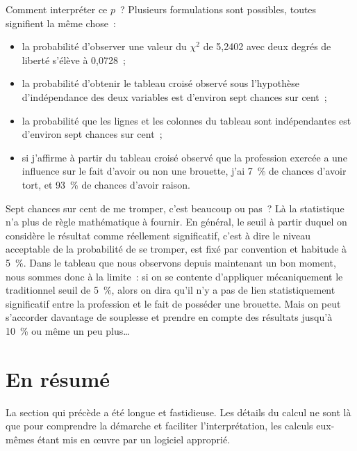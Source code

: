 \documentclass[a4paper,10pt,twoside,francais]{report}
\newcommand{\chid}{$\chi^2$\xspace}
\begin{document}
Comment interpréter ce $p$~? Plusieurs formulations sont possibles,
toutes signifient la même chose~:

\begin{itemize}
\item la probabilité d'observer une valeur du \chid de 5,2402 avec
  deux degrés de liberté s'élève à 0,0728~;
\item la probabilité d'obtenir le tableau croisé observé sous
  l'hypothèse d'indépendance des deux variables est d'environ sept
  chances sur cent~;
\item la probabilité que les lignes et les colonnes du tableau sont
  indépendantes est d'environ sept chances sur cent~;
\item si j'affirme à partir du tableau croisé observé que la
  profession exercée a une influence sur le fait d'avoir ou non une
  brouette, j'ai 7~\% de chances d'avoir tort, et 93~\% de chances
  d'avoir raison.
\end{itemize}

Sept chances sur cent de me tromper, c'est beaucoup ou pas~? Là la
statistique n'a plus de règle mathématique à fournir. En général, le
seuil à partir duquel on considère le résultat comme réellement
significatif, c'est à dire le niveau \og acceptable \fg{} de la
probabilité de se tromper, est fixé par convention et habitude à
5~\%. Dans le tableau que nous observons depuis maintenant un bon
moment, nous sommes donc à la limite~: si on se contente d'appliquer
mécaniquement le traditionnel seuil de 5~\%, alors on dira qu'il n'y a
pas de lien statistiquement significatif entre la profession et le
fait de posséder une brouette. Mais on peut s'accorder davantage de
souplesse et prendre en compte des résultats jusqu'à 10~\% ou même un
peu plus\ldots


\section{En résumé}

La section qui précède a été longue et fastidieuse. Les détails du
calcul ne sont là que pour comprendre la démarche et faciliter
l'interprétation, les calculs eux-mêmes étant mis en \oe{}uvre par un
logiciel approprié.
\end{document}
